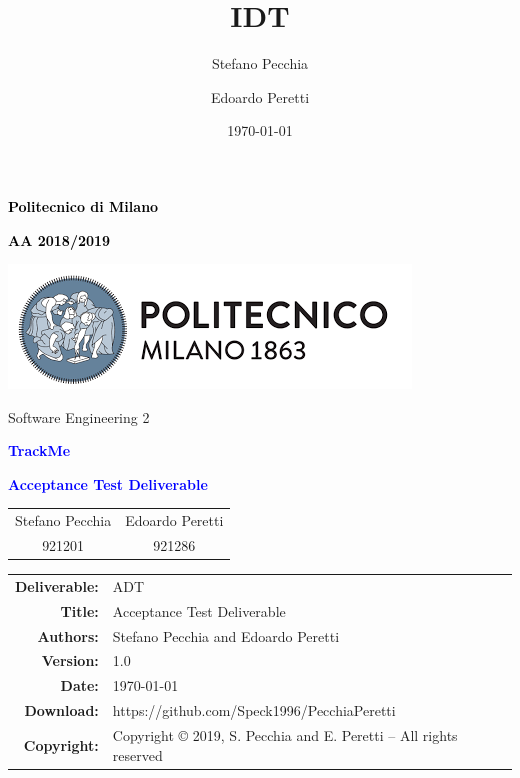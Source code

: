 \documentclass[11pt,a4paper]{article}
\title{IDT}
\author{Stefano Pecchia \and Edoardo Peretti}
\date{\today}
\begin{document}
\begin{titlepage}
\centering

\textcolor{black}{\textbf{Politecnico di Milano}} \par
\textcolor{black}{\textbf{AA 2018/2019}} \par  \vspace{2em}
\includegraphics[scale=0.7]{resources/PolimiLogo}\par \vspace{1em}

Software Engineering 2 \par \vspace{1.5cm}
\textcolor{Blue}{\Large\textbf{TrackMe}} \par \vspace{3cm}
 
{\textcolor{Blue}{\textbf{\Huge{Acceptance Test Deliverable}}}} \vfill
\renewcommand\tabcolsep{4.5em}
\begin{tabular}{cc}
Stefano Pecchia & Edoardo Peretti   \\
921201  & 921286
\end{tabular}
\renewcommand\tabcolsep{6pt}

\vspace{4cm}
\end{titlepage}


\begin{table}[h!]
\centering
\begin{tabular}{rl}
\hline
\textbf{Deliverable:} & ADT\\
\textbf{Title:} & Acceptance Test Deliverable\\
\textbf{Authors:} & Stefano Pecchia and Edoardo Peretti\\
\textbf{Version:} & 1.0 \\ 
\textbf{Date:} & \today \\
\textbf{Download:} & https://github.com/Speck1996/PecchiaPeretti \\
\textbf{Copyright:} & Copyright © 2019, S. Pecchia and E. Peretti – All rights reserved \\
\hline
\end{tabular}
\end{table}

\newpage
\tableofcontents





\end{document}
